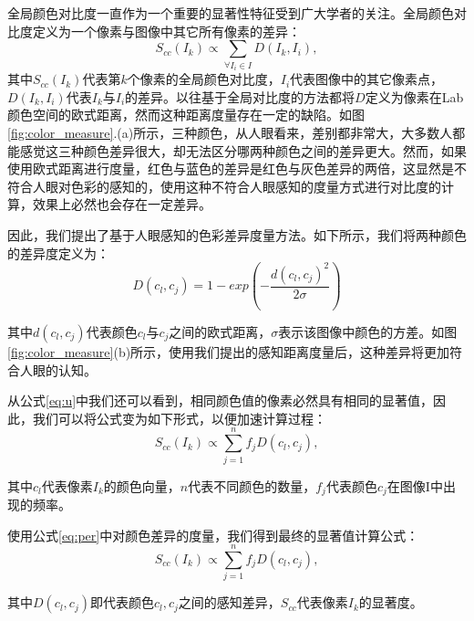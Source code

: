 全局颜色对比度一直作为一个重要的显著性特征受到广大学者的关注\cite{ma2003contrast}\cite{liu2011learning}\cite{cheng2011global}。全局颜色对比度定义为一个像素与图像中其它所有像素的差异：
\begin{equation}
  S_{cc}(I_k) \propto \sum_{\forall{I_i \in I}} D(I_k, I_i) ,\label{eq:u}
\end{equation}
其中$S_{cc}(I_k)$代表第$k$个像素的全局颜色对比度，$I_i$代表图像中的其它像素点，$D(I_k, I_i)$代表$I_k$与$I_i$的差异。以往基于全局对比度的方法都将$D$定义为像素在Lab颜色空间的欧式距离，然而这种距离度量存在一定的缺陷。如图\ref{fig:color_measure}.(a)所示，三种颜色，从人眼看来，差别都非常大，大多数人都能感觉这三种颜色差异很大，却无法区分哪两种颜色之间的差异更大。然而，如果使用欧式距离进行度量，红色与蓝色的差异是红色与灰色差异的两倍，这显然是不符合人眼对色彩的感知的，使用这种不符合人眼感知的度量方式进行对比度的计算，效果上必然也会存在一定差异。

因此，我们提出了基于人眼感知的色彩差异度量方法。如下所示，我们将两种颜色的差异度定义为：
\begin{equation}
  D(c_l, c_j) = 1 - exp(-\frac{d(c_l, c_j)^2}{2\sigma}) \label{eq:per}
\end{equation}

其中$d(c_l, c_j)$代表颜色$c_l$与$c_j$之间的欧式距离，$\sigma$表示该图像中颜色的方差。如图\ref{fig:color_measure}(b)所示，使用我们提出的感知距离度量后，这种差异将更加符合人眼的认知。

从公式\ref{eq:u}中我们还可以看到，相同颜色值的像素必然具有相同的显著值，因此，我们可以将公式变为如下形式，以便加速计算过程：
\begin{equation}
  S_{cc}(I_k) \propto \sum_{j=1}^{n} f_j D(c_l, c_j),
\end{equation}

其中$c_l$代表像素$I_k$的颜色向量，$n$代表不同颜色的数量，$f_j$代表颜色$c_j$在图像I中出现的频率。

使用公式\ref{eq:per}中对颜色差异的度量，我们得到最终的显著值计算公式：
\begin{equation}
  S_{cc}(I_k) \propto \sum_{j=1}^{n} f_j D(c_l, c_j),
\end{equation}

其中$D(c_l, c_j)$即代表颜色$c_l,c_j$之间的感知差异，$S_{cc}$代表像素$I_k$的显著度。

